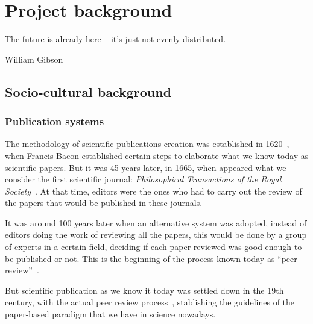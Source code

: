 \chapter{Project background}

\begin{FraseCelebre}
  \begin{Frase}
    The future is already here – it's just not evenly distributed.
  \end{Frase}
  \begin{Fuente}
    William Gibson
  \end{Fuente}
\end{FraseCelebre}


\section{Socio-cultural background}
\label{scb}
\subsection{Publication systems}
\label{scb:ps}
The methodology of scientific publications creation was established in
1620~\cite{bacon1878novum}, when Francis Bacon established certain steps to
elaborate what we know today as scientific papers. But it was 45 years later, in
1665, when appeared what we consider the first scientific journal:
\emph{Philosophical Transactions of the Royal
  Society}~\cite{kronick1976history}. At that time, editors were the ones who
had to carry out the review of the papers that would be published in these
journals.

It was around 100 years later when an alternative system was adopted, instead of
editors doing the work of reviewing all the papers, this would be done by a
group of experts in a certain field, deciding if each paper reviewed was good
enough to be published or not. This is the beginning of the process known today
as ``peer review''~\cite{spier2002history}.

But scientific publication as we know it today was settled down in the 19th
century, with the actual peer review process~\cite{burnham1990evolution},
stablishing the guidelines of the paper-based paradigm that we have in science
nowadays.

